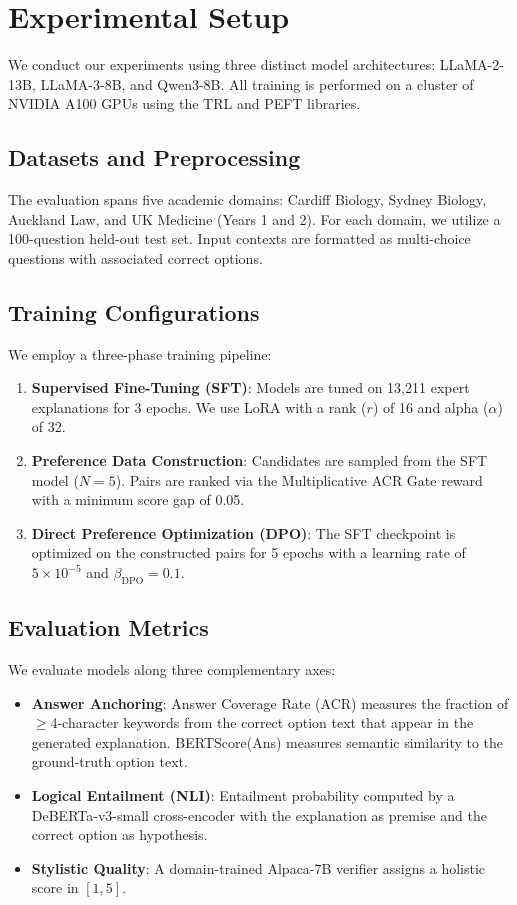 \section{Experimental Setup}

We conduct our experiments using three distinct model architectures: LLaMA-2-13B, LLaMA-3-8B, and Qwen3-8B. All training is performed on a cluster of NVIDIA A100 GPUs using the TRL and PEFT libraries.

\subsection{Datasets and Preprocessing}
The evaluation spans five academic domains: Cardiff Biology, Sydney Biology, Auckland Law, and UK Medicine (Years 1 and 2). For each domain, we utilize a 100-question held-out test set. Input contexts are formatted as multi-choice questions with associated correct options.

\subsection{Training Configurations}
We employ a three-phase training pipeline:
\begin{enumerate}
    \item \textbf{Supervised Fine-Tuning (SFT)}: Models are tuned on 13,211 expert explanations for 3 epochs. We use LoRA with a rank ($r$) of 16 and alpha ($\alpha$) of 32.
    \item \textbf{Preference Data Construction}: Candidates are sampled from the SFT model ($N=5$). Pairs are ranked via the Multiplicative ACR Gate reward with a minimum score gap of 0.05.
    \item \textbf{Direct Preference Optimization (DPO)}: The SFT checkpoint is optimized on the constructed pairs for 5 epochs with a learning rate of $5 \times 10^{-5}$ and $\beta_{\text{DPO}} = 0.1$.
\end{enumerate}

\subsection{Evaluation Metrics}
\label{sec:metrics}

We evaluate models along three complementary axes:
\begin{itemize}
    \item \textbf{Answer Anchoring}: Answer Coverage Rate (ACR) measures the fraction of $\geq$4-character keywords from the correct option text that appear in the generated explanation. BERTScore(Ans) measures semantic similarity to the ground-truth option text.
    \item \textbf{Logical Entailment (NLI)}: Entailment probability computed by a DeBERTa-v3-small cross-encoder with the explanation as premise and the correct option as hypothesis.
    \item \textbf{Stylistic Quality}: A domain-trained Alpaca-7B verifier assigns a holistic score in $[1, 5]$.
\end{itemize}

